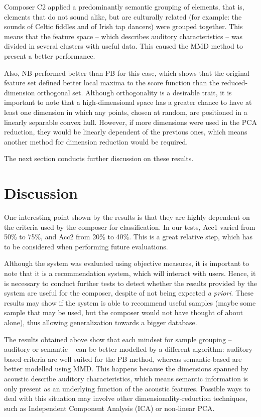 \documentclass{article}
\begin{document}
Composer C2 applied a predominantly semantic grouping of
elements, that is, elements that do not sound alike, but are
culturally related (for example: the sounds of Celtic fiddles and of
Irish tap dancers) were grouped together. This means that the feature
space -- which describes auditory characteristics -- was divided in
several clusters with useful data. This caused the MMD method to
present a better performance.

Also, NB performed better than PB for this case, which shows
that the original feature set defined better local maxima to the score
function than the reduced-dimension orthogonal set. Although
orthogonality is a desirable trait, it is important to note that a
high-dimensional space has a greater chance to have at least one
dimension in which any points, chosen at random, are positioned in a
linearly separable convex hull. However, if more dimensions were used in
the PCA reduction, they would be linearly dependent of the previous ones,
which means another method for dimension reduction would be required.

The next section conducts further discussion on these results.

\section{Discussion}\label{sec:discussion}
One interesting point shown by the results is that they are highly
dependent on the criteria used by the composer for
classification. In our tests, Acc1 varied from 50\% to 75\%, and Acc2
from 20\% to 40\%. This is a great relative step, which has to be
considered when performing future evaluations.

Although the system was evaluated using objective measures, it is
important to note that it is a recommendation system, which will
interact with users. Hence, it is necessary to conduct further tests
to detect whether 
the results provided by the system are useful for the composer,
despite of not being expected \textit{a priori}. These results may
show if the system is able to recommend useful samples (maybe some
sample that may be used, but the composer would not have thought of
about alone), thus allowing generalization towards a bigger database.

The results obtained above show that each mindset for sample grouping
-- auditory or semantic -- can be better modelled by a different
algorithm: auditory-based criteria are well suited for the PB method,
whereas semantic-based are better modelled using MMD. This happens
because the dimensions spanned by acoustic describe auditory
characteristics, which means semantic information is only present as
an underlying function of the acoustic features. Possible ways to deal
with this situation may involve other dimensionality-reduction
techniques, such as Independent Component Analysis (ICA) or non-linear
PCA.
\end{document}

